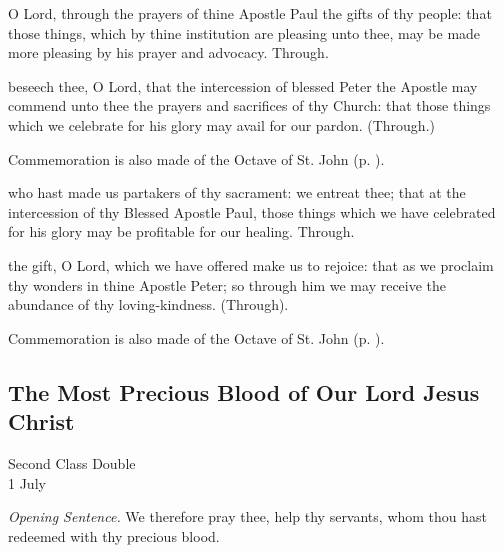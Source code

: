 
\vspace{-0.5\baselineskip}

\secret

\vspace{-0.1\baselineskip}

 O Lord, through the prayers of thine Apostle Paul the gifts of thy people: that those things, which by thine institution are pleasing unto thee, may be made more pleasing by his prayer and advocacy. Through.

 beseech thee, O Lord, that the intercession of blessed Peter the Apostle may commend unto thee the prayers and sacrifices of thy Church: that those things which we celebrate for his glory may avail for our pardon. (Through.)

\begin{rubric}
	Commemoration is also made of the Octave of St. John (p. \pageref{JohnSecret}).
\end{rubric}


\postcommunion
{} who hast made us partakers of thy sacrament: we entreat thee; that at the intercession of thy Blessed Apostle Paul, those things which we have celebrated for his glory may be profitable for our healing. Through.

 the gift, O Lord, which we have offered make us to rejoice: that as we proclaim thy wonders in thine Apostle Peter; so through him we may receive the abundance of thy loving-kindness. (Through).

\begin{rubric}
	Commemoration is also made of the Octave of St. John (p. \pageref{JohnPC}).
\end{rubric}


\subsection{The Most Precious Blood of Our Lord Jesus Christ}
\begin{inhead}
    {Second Class Double\\
1 July}
\end{inhead}
\par\noindent
\textit{Opening Sentence.} We therefore pray thee, help thy servants, whom thou hast redeemed with thy precious blood.

